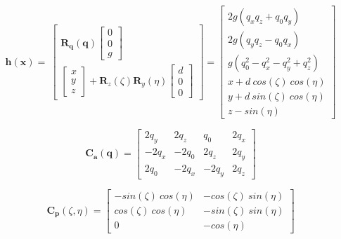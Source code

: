 \begin{equation}
	\bm{h} \left(\bm{x} \right)
	= 
	\
	\begin{bmatrix}
		\bm{R_q} \left( \bm{q} \right) 
		\begin{bmatrix}
			0 \\ 0 \\ g 
		\end{bmatrix}\\
		\begin{bmatrix}
			x \\ y \\ z 
		\end{bmatrix}
		+
		\bm{R}_z \left( \zeta \right)
		\bm{R}_y \left( \eta \right)
		\begin{bmatrix}
			d \\ 0 \\ 0 
		\end{bmatrix}
	\end{bmatrix}
	=
	\begin{bmatrix}
		2g(q_x q_z + q_0 q_y) \\
		2g(q_y q_z - q_0 q_x) \\
		g(q_0^2 - q_x^2 - q_y^2 + q_z^2) \\
		x + d\ cos(\zeta)\ cos(\eta)\\
		y + d\ sin(\zeta)\ cos(\eta)\\
		z - sin(\eta)
	\end{bmatrix}
	\label{h_fun}
\end{equation}

\begin{equation}
	\bm{C_a} \left( \bm{q} \right)
	=
	\begin{bmatrix}
		2q_y & 2q_z & q_0 & 2q_x \\
		-2q_x & -2q_0 & 2q_z & 2q_y \\
		2q_0 & -2q_x & -2q_y & 2q_z
	\end{bmatrix}
	\label{measurement_jacobi_start}
\end{equation}

\begin{equation}
	\bm{C_p} \left( \zeta, \eta \right)
	=
	\begin{bmatrix}
		-sin(\zeta)\ cos(\eta) & -cos(\zeta)\ sin(\eta)\\
		 cos(\zeta)\ cos(\eta) & -sin(\zeta)\ sin(\eta)\\
		 0				  & -cos(\eta)
		
	\end{bmatrix}
\end{equation}

